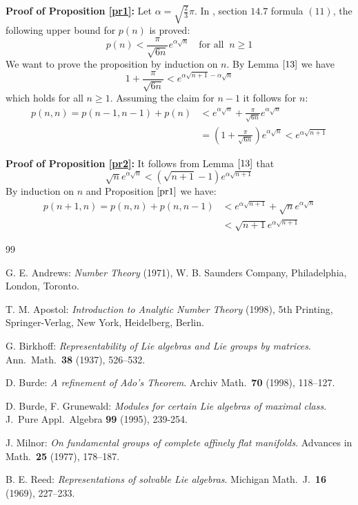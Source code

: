 \documentclass[12pt]{amsart}
\theoremstyle{definition}
\theoremstyle{remark}
\newcommand{\al}{\alpha}
\begin{document}
{\bf Proof of Proposition \ref{pr1}:} 
Let $\al=\sqrt{\frac{2}{3}}\pi$.
In \cite{APO}, section $14.7$ formula $(11)$, the following upper bound for
$p(n)$ is proved:
\begin{equation*}
p(n)<\frac{\pi}{\sqrt{6n}}e^{\al\sqrt{n}} \quad \text{for all} \;\; n\ge 1
\end{equation*}
We want to prove the proposition by induction on $n$.
By Lemma $\ref{13}$ we have 
\begin{equation*}
1+\frac{\pi}{\sqrt{6n}}<
e^{\al\sqrt{n+1}-\al\sqrt{n}}
\end{equation*}
which holds for all $n\ge 1$.
Assuming the claim for $n-1$ it follows for $n$:
\begin{align*}
p(n,n) =p(n-1,n-1)+p(n) & <e^{\al\sqrt{n}}+
\frac{\pi}{\sqrt{6n}}e^{\al\sqrt{n}} \\
         & = \left(1+\frac{\pi}{\sqrt{6n}}\right)e^{\al\sqrt{n}}<e^{\al\sqrt{n+1}}
\end{align*}


{\bf Proof of Proposition \ref{pr2}:} 
It follows from Lemma $\ref{13}$ that 
\begin{equation*}
\sqrt{n}e^{\al\sqrt{n}}<\left(\sqrt{n+1}-1\right)e^{\al\sqrt{n+1}}
\end{equation*}
By induction on $n$ and Proposition $\ref{pr1}$ we have:
\begin{align*}
p(n+1,n) =p(n,n)+p(n,n-1) & <e^{\al\sqrt{n+1}}+\sqrt{n}e^{\al\sqrt{n}}\\
         & <\sqrt{n+1}e^{\al\sqrt{n+1}}
\end{align*}



\begin{thebibliography}{99}

 G. E. Andrews: {\it Number Theory}
(1971), W. B. Saunders Company, Philadelphia, London, Toronto.

 T. M. Apostol: {\it Introduction to Analytic Number Theory}
(1998), 5th Printing, Springer-Verlag, New York, Heidelberg, Berlin.

 G. Birkhoff: {\it Representability of Lie algebras and
Lie groups by matrices}. Ann.\ Math.\ \textbf{38} (1937), 526--532.   

 D. Burde: {\it A refinement of Ado's Theorem}. Archiv Math.\
\textbf{70} (1998), 118--127.

 D. Burde, F. Grunewald: {\it Modules for certain Lie
algebras of maximal class}. J.\ Pure Appl.\ Algebra \textbf{99} (1995),
239-254.   

 J. Milnor: {\it On fundamental groups of complete affinely
flat manifolds}. Advances in Math.\ \textbf{25} (1977), 178--187.

 B. E. Reed: {\it Representations of solvable Lie algebras}.
Michigan Math.\ J.\ \textbf{16} (1969), 227--233.      



\end{thebibliography}    
\end{document}
